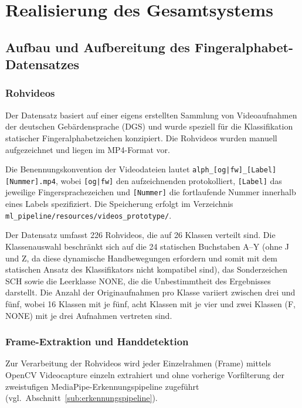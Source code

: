 \chapter{Realisierung des Gesamtsystems}\label{ch:entwicklung}

\section{Aufbau und Aufbereitung des Fingeralphabet-Datensatzes}\label{sec:datensatz}
\subsection{Rohvideos}\label{sub:rohvideos}

Der Datensatz basiert auf einer eigens erstellten Sammlung von Videoaufnahmen der deutschen Gebärdensprache (DGS) und wurde speziell für die Klassifikation statischer Fingeralphabetzeichen konzipiert. Die Rohvideos wurden manuell aufgezeichnet und liegen im MP4-Format vor.

Die Benennungskonvention der Videodateien lautet \texttt{alph\_[og|fw]\_[Label][Nummer].mp4}, wobei \texttt{[og|fw]} den aufzeichnenden protokolliert, \texttt{[Label]} das jeweilige Fingersprachezeichen und \texttt{[Nummer]} die fortlaufende Nummer innerhalb eines Labels spezifiziert. Die Speicherung erfolgt im Verzeichnis \texttt{ml\_pipeline/resources/videos\_prototype/}.

Der Datensatz umfasst 226 Rohvideos, die auf 26 Klassen verteilt sind. Die Klassenauswahl beschränkt sich auf die 24 statischen Buchstaben A–Y (ohne J und Z, da diese dynamische Handbewegungen erfordern und somit mit dem statischen Ansatz des Klassifikators nicht kompatibel sind), das Sonderzeichen SCH sowie die Leerklasse NONE, die die Unbestimmtheit des Ergebnisses darstellt. Die Anzahl der Originaufnahmen pro Klasse variiert zwischen drei und fünf, wobei 16 Klassen mit je fünf, acht Klassen mit je vier und zwei Klassen (F, NONE) mit je drei Aufnahmen vertreten sind.

\subsection{Frame-Extraktion und Handdetektion}\label{sub:frame-extraktion}

Zur Verarbeitung der Rohvideos wird jeder Einzelrahmen (Frame) mittels OpenCV Videocapture einzeln extrahiert und ohne vorherige Vorfilterung der zweistufigen MediaPipe-Erkennungs\-pipeline zugeführt (vgl.\ Abschnitt~\ref{sub:erkennungspipeline}).

